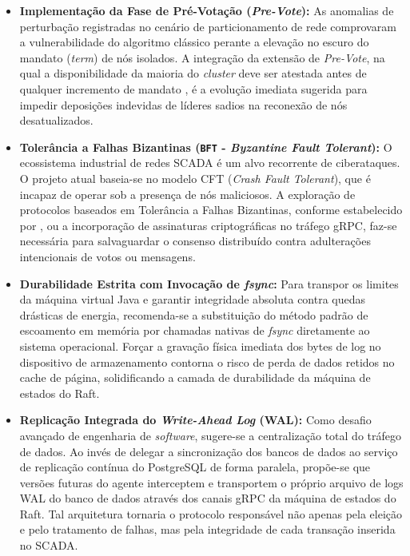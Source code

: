 \begin{itemize}
    \item \textbf{Implementação da Fase de Pré-Votação (\textit{Pre-Vote}):} As anomalias de perturbação registradas no cenário de particionamento de rede comprovaram a vulnerabilidade do algoritmo clássico perante a elevação no escuro do mandato (\textit{term}) de nós isolados. A integração da extensão de \textit{Pre-Vote}, na qual a disponibilidade da maioria do \textit{cluster} deve ser atestada antes de qualquer incremento de mandato \cite{raft2014}, é a evolução imediata sugerida para impedir deposições indevidas de líderes sadios na reconexão de nós desatualizados.
    
    \item \textbf{Tolerância a Falhas Bizantinas (\verb|BFT| - \textit{Byzantine Fault Tolerant}):} O ecossistema industrial de redes SCADA é um alvo recorrente de ciberataques. O projeto atual baseia-se no modelo CFT (\textit{Crash Fault Tolerant}), que é incapaz de operar sob a presença de nós maliciosos. A exploração de protocolos baseados em Tolerância a Falhas Bizantinas, conforme estabelecido por , ou a incorporação de assinaturas criptográficas no tráfego gRPC, faz-se necessária para salvaguardar o consenso distribuído contra adulterações intencionais de votos ou mensagens.
    
    \item \textbf{Durabilidade Estrita com Invocação de \textit{fsync}:} Para transpor os limites da máquina virtual Java e garantir integridade absoluta contra quedas drásticas de energia, recomenda-se a substituição do método padrão de escoamento em memória por chamadas nativas de \textit{fsync} diretamente ao sistema operacional. Forçar a gravação física imediata dos bytes de log no dispositivo de armazenamento contorna o risco de perda de dados retidos no cache de página, solidificando a camada de durabilidade da máquina de estados do Raft.
    
    \item \textbf{Replicação Integrada do \textit{Write-Ahead Log} (WAL):} Como desafio avançado de engenharia de \textit{software}, sugere-se a centralização total do tráfego de dados. Ao invés de delegar a sincronização dos bancos de dados ao serviço de replicação contínua do PostgreSQL de forma paralela, propõe-se que versões futuras do agente interceptem e transportem o próprio arquivo de logs WAL do banco de dados através dos canais gRPC da máquina de estados do Raft. Tal arquitetura tornaria o protocolo responsável não apenas pela eleição e pelo tratamento de falhas, mas pela integridade de cada transação inserida no SCADA.
\end{itemize}

